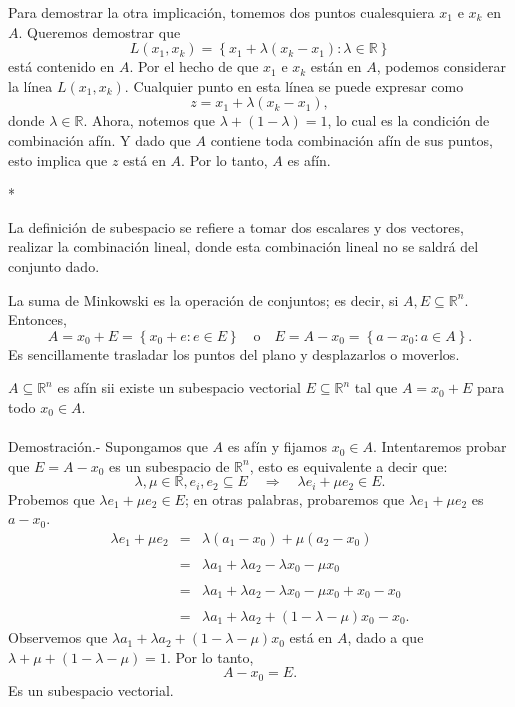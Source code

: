 \begin{paracol}{2}
{\begin{teo}
	Para demostrar la otra implicación, tomemos dos puntos cualesquiera $x_1$ e $x_k$ en $A$. Queremos demostrar que 
	$$L(x_1, x_k) = \left\{x_1 + \lambda(x_k - x_1) : \lambda \in \mathbb{R}\right\}$$ 
	está contenido en $A$.
	Por el hecho de que $x_1$ e $x_k$ están en $A$, podemos considerar la línea $L(x_1, x_k)$. Cualquier punto en esta línea se puede expresar como 
	$$z = x_1 + \lambda(x_k - x_1),$$ 
	donde $\lambda \in \mathbb{R}$. Ahora, notemos que $\lambda + (1 - \lambda) = 1$, lo cual es la condición de combinación afín. Y dado que $A$ contiene toda combinación afín de sus puntos, esto implica que $z$ está en $A$. Por lo tanto, $A$ es afín.
    \end{teo}
}
\switchcolumn[1]*{\noindent\scriptsize
\begin{nota}
La definición de subespacio se refiere a tomar dos escalares y dos vectores, realizar la combinación lineal, donde esta combinación lineal no se saldrá del conjunto dado.
\end{nota}
}
\switchcolumn[0]\noindent
\begin{notacion}
La suma de Minkowski es la operación de conjuntos; es decir, si $A,E\subseteq \mathbb{R}^n$. Entonces,
$$A=x_0+E=\left\{x_0+e:e\in E \right\} \quad \mbox{o}\quad E=A-x_0=\left\{a-x_0:a\in A\right\}.$$ 
Es sencillamente trasladar los puntos del plano y desplazarlos o moverlos.
\end{notacion}

\begin{teo}
    $A\subseteq \mathbb{R}^n$ es afín sii existe un subespacio vectorial $E\subseteq \mathbb{R}^n$ tal que $A=x_0+E$ para todo $x_0\in A$.\\\\
	Demostración.-\; Supongamos que $A$ es afín y fijamos $x_0\in A$. Intentaremos probar que $E=A-x_0$ es un subespacio de $\mathbb{R}^n$, esto es equivalente a decir que:
	$$\lambda,\mu \in \mathbb{R}, e_i,e_2\subseteq E \quad \Rightarrow \quad \lambda e_i+\mu e_2\in E.$$
	Probemos que $\lambda e_1+\mu e_2\in E$; en otras palabras, probaremos que $\lambda e_1+\mu e_2$ es $a-x_0$.
	$$
	\begin{array}{rcl}
	    \lambda e_1+\mu e_2&=&\lambda(a_1-x_0)+\mu(a_2-x_0)\\\\
			       &=&\lambda a_1 + \lambda a_2 - \lambda x_0-\mu x_0\\\\
			       &=&\lambda a_1 + \lambda a_2 - \lambda x_0-\mu x_0 +x_0-x_0\\\\
			       &=&\lambda a_1 + \lambda a_2+(1-\lambda-\mu)x_0-x_0.
	\end{array}
	$$
	Observemos que $\lambda a_1 + \lambda a_2+(1-\lambda-\mu)x_0$ está en $A$, dado a que $\lambda+\mu+(1-\lambda-\mu)=1$. Por lo tanto,
	$$A-x_0=E.$$
	Es un subespacio vectorial.


\end{teo}
\end{paracol}
